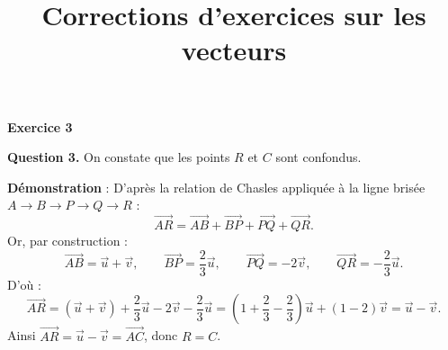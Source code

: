 \documentclass[12pt]{article}
\title{Corrections d'exercices sur les vecteurs}
\date{}
\begin{document}
\maketitle

\newenvironment{exercice}[1]{%
  \par\bigskip\noindent\textbf{Exercice #1}\par\smallskip\noindent\ignorespaces
}{%
  \par
}

\begin{exercice}{3}{}

\textbf{Question 3.} On constate que les points $R$ et $C$ sont confondus.

\medskip
\textbf{Démonstration} : D'après la relation de Chasles appliquée à la ligne brisée $A \to B \to P \to Q \to R$ :
\[
\overrightarrow{AR} = \overrightarrow{AB} + \overrightarrow{BP} + \overrightarrow{PQ} + \overrightarrow{QR}.
\]
Or, par construction :
\[
\overrightarrow{AB} = \vec u + \vec v, \qquad
\overrightarrow{BP} = \frac{2}{3}\vec u, \qquad
\overrightarrow{PQ} = -2\vec v, \qquad
\overrightarrow{QR} = -\frac{2}{3}\vec u.
\]
D'où :
\[
\overrightarrow{AR} = (\vec u + \vec v) + \frac{2}{3}\vec u - 2\vec v - \frac{2}{3}\vec u
= \left(1 + \frac{2}{3} - \frac{2}{3}\right)\vec u + (1-2)\vec v
= \vec u - \vec v.
\]
Ainsi $\overrightarrow{AR} = \vec u - \vec v = \overrightarrow{AC}$, donc $R = C$.

\end{exercice}
\end{document}
